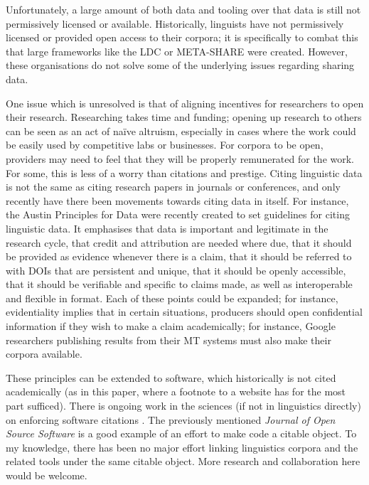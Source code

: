 Unfortunately, a large amount of both data and tooling over that data is still not permissively licensed or available. Historically, linguists have not permissively licensed or provided open access to their corpora; it is specifically to combat this that large frameworks like the LDC or META-SHARE were created. However, these organisations do not solve some of the underlying issues regarding sharing data.

One issue which is unresolved is that of aligning incentives for researchers to open their research. Researching takes time and funding; opening up research to others can be seen as an act of na\"{i}ve altruism, especially in cases where the work could be easily used by competitive labs or businesses. For corpora to be open, providers may need to feel that they will be properly remunerated for the work. For some, this is less of a worry than citations and prestige. Citing linguistic data is not the same as citing research papers in journals or conferences, and only recently have there been movements towards citing data in itself. For instance, the Austin Principles for Data \citep{AustinPrinciples2017} were recently created to set guidelines for citing linguistic data. It emphasises that data is important and legitimate in the research cycle, that credit and attribution are needed where due, that it should be provided as evidence whenever there is a claim, that it should be referred to with DOIs that are persistent and unique, that it should be openly accessible, that it should be verifiable and specific to claims made, as well as interoperable and flexible in format. Each of these points could be expanded; for instance, evidentiality implies that in certain situations, producers should open confidential information if they wish to make a claim academically; for instance, Google researchers publishing results from their MT systems must also make their corpora available.

These principles can be extended to software, which historically is not cited academically (as in this paper, where a footnote to a website has for the most part sufficed). There is ongoing work in the sciences (if not in linguistics directly) on enforcing software citations \citep{DBLP:journals/corr/KatzCWHVHSJCCVL15, katz2016report}. The previously mentioned {\it Journal of Open Source Software} \citep{smith2018journal} is a good example of an effort to make code a citable object. To my knowledge, there has been no major effort linking linguistics corpora and the related tools under the same citable object. More research and collaboration here would be welcome.

